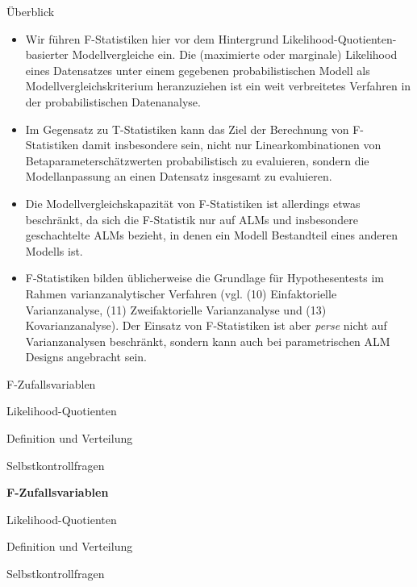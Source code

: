 \documentclass[
  8pt,
  ignorenonframetext,
]{beamer}
\begin{document}
\begin{frame}{}
\protect\hypertarget{section-7}{}
\small

Überblick

\begin{itemize}
\item
  \justifying Wir führen F-Statistiken hier vor dem Hintergrund
  Likelihood-Quotienten-basierter Modellvergleiche ein. Die (maximierte
  oder marginale) Likelihood eines Datensatzes unter einem gegebenen
  probabilistischen Modell als Modellvergleichskriterium heranzuziehen
  ist ein weit verbreitetes Verfahren in der probabilistischen
  Datenanalyse.
\item
  \justifying Im Gegensatz zu T-Statistiken kann das Ziel der Berechnung
  von F-Statistiken damit insbesondere sein, nicht nur
  Linearkombinationen von Betaparameterschätzwerten probabilistisch zu
  evaluieren, sondern die Modellanpassung an einen Datensatz insgesamt
  zu evaluieren.
\item
  \justifying Die Modellvergleichskapazität von F-Statistiken ist
  allerdings etwas beschränkt, da sich die F-Statistik nur auf ALMs und
  insbesondere geschachtelte ALMs bezieht, in denen ein Modell
  Bestandteil eines anderen Modells ist.
\item
  \justifying F-Statistiken bilden üblicherweise die Grundlage für
  Hypothesentests im Rahmen varianzanalytischer Verfahren (vgl. (10)
  Einfaktorielle Varianzanalyse, (11) Zweifaktorielle Varianzanalyse und
  (13) Kovarianzanalyse). Der Einsatz von F-Statistiken ist aber
  \emph{perse} nicht auf Varianzanalysen beschränkt, sondern kann auch
  bei parametrischen ALM Designs angebracht sein.
\end{itemize}
\end{frame}

\begin{frame}{}
\protect\hypertarget{section-8}{}
\vfill
\large
{}

F-Zufallsvariablen

Likelihood-Quotienten

Definition und Verteilung

Selbstkontrollfragen \vfill
\end{frame}

\begin{frame}{}
\protect\hypertarget{section-9}{}
\vfill
\large
{}

\textbf{F-Zufallsvariablen}

Likelihood-Quotienten

Definition und Verteilung

Selbstkontrollfragen \vfill
\end{frame}
\end{document}
